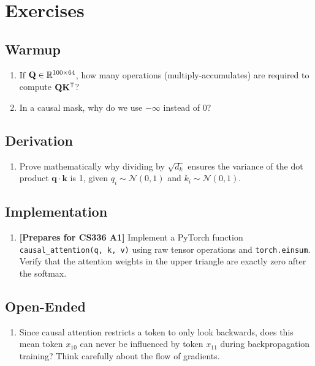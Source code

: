 \section{Exercises}
\label{ch:09:sec:exercises}

\subsection*{Warmup}
\begin{enumerate}
  \item If $\mathbf{Q} \in \mathbb{R}^{100 \times 64}$, how many operations (multiply-accumulates) are required to compute $\mathbf{Q}\mathbf{K}^{\mathsf{T}}$?
  \item In a causal mask, why do we use $-\infty$ instead of 0?
\end{enumerate}

\subsection*{Derivation}
\begin{enumerate}
  \item Prove mathematically why dividing by $\sqrt{d_k}$ ensures the variance of the dot product $\mathbf{q} \cdot \mathbf{k}$ is 1, given $q_i \sim \mathcal{N}(0, 1)$ and $k_i \sim \mathcal{N}(0, 1)$.
\end{enumerate}

\subsection*{Implementation}
\begin{enumerate}
  \item \textbf{[Prepares for CS336 A1]} Implement a PyTorch function \texttt{causal\_attention(q, k, v)} using raw tensor operations and \texttt{torch.einsum}. Verify that the attention weights in the upper triangle are exactly zero after the softmax.
\end{enumerate}

\subsection*{Open-Ended}
\begin{enumerate}
  \item Since causal attention restricts a token to only look backwards, does this mean token $x_{10}$ can never be influenced by token $x_{11}$ during backpropagation training? Think carefully about the flow of gradients.
\end{enumerate}

